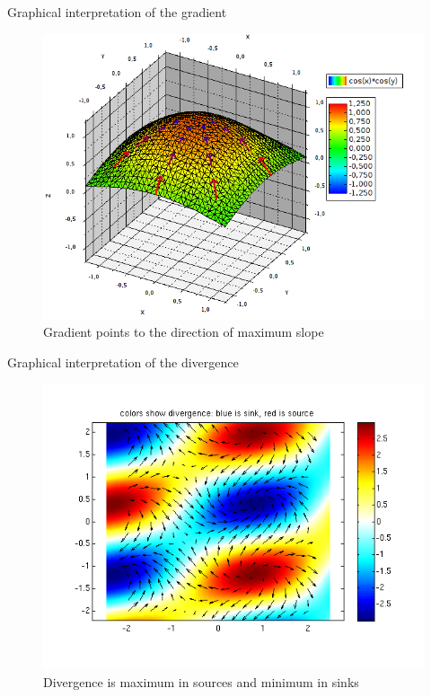 \documentclass{beamer}
\begin{document}
  \begin{frame}{Graphical interpretation of the gradient}

    \begin{figure}
    \includegraphics[scale=0.4]{img/gradient.png}
    \caption{\label{fig:gradient}Gradient points to the direction of maximum slope}
    \end{figure}

  \end{frame}

  \begin{frame}{Graphical interpretation of the divergence}

    \begin{figure}
    \includegraphics[scale=0.5]{img/divergence.png}
    \caption{\label{fig:divergence}Divergence is maximum in sources and minimum in sinks}
    \end{figure}

  \end{frame}
\end{document}
